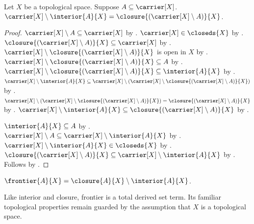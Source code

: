 \begin{proposition}\label{complement_interior_eq_closure_complement}
    Let $X$ be a topological space.
    Suppose $A \subseteq \carrier[X]$.
    $\carrier[X]\setminus\interior{A}{X} = \closure{(\carrier[X]\setminus A)}{X}$.
\end{proposition}
\begin{proof}
    $\carrier[X]\setminus A\subseteq\carrier[X]$ by .
    $\carrier[X]\in\closeds{X}$
        by .
    $\closure{(\carrier[X]\setminus A)}{X}\subseteq\carrier[X]$
        by .
    $\carrier[X]\setminus\closure{(\carrier[X]\setminus A)}{X}$
        is open in $X$ by .
    $\carrier[X]\setminus\closure{(\carrier[X]\setminus A)}{X}\subseteq A$
        by .
    $\carrier[X]\setminus\closure{(\carrier[X]\setminus A)}{X}
        \subseteq\interior{A}{X}$ by .
    $\carrier[X]\setminus\interior{A}{X}
        \subseteq\carrier[X]\setminus
            (\carrier[X]\setminus\closure{(\carrier[X]\setminus A)}{X})$
        by .
    $\carrier[X]\setminus
        (\carrier[X]\setminus\closure{(\carrier[X]\setminus A)}{X})
        =\closure{(\carrier[X]\setminus A)}{X}$
        by .
    $\carrier[X]\setminus\interior{A}{X}
        \subseteq\closure{(\carrier[X]\setminus A)}{X}$
        by .

    $\interior{A}{X}\subseteq A$ by .
    $\carrier[X]\setminus A
        \subseteq\carrier[X]\setminus\interior{A}{X}$
        by .
    $\carrier[X]\setminus\interior{A}{X}\in\closeds{X}$
        by .
    $\closure{(\carrier[X]\setminus A)}{X}
        \subseteq\carrier[X]\setminus\interior{A}{X}$
        by .
    Follows by .
\end{proof}



\begin{definition}[Frontier]\label{frontier}
    $\frontier{A}{X} = \closure{A}{X}\setminus\interior{A}{X}$.
\end{definition}

Like interior and closure, frontier is a total derived set term. Its familiar
topological properties remain guarded by the assumption that $X$ is a
topological space.

